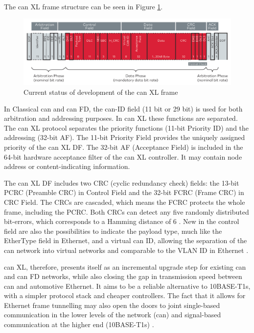 The \gls{can} XL frame structure can be seen in Figure \ref{fig:CANXL_Frame}.

\begin{figure}
    \centering
    \includegraphics[width = \textwidth]{img/parts/introduction/CAN XL.png}
    \caption{Current status of development of the \gls{can} XL frame \citep{VectorCANXL}}
    \label{fig:CANXL_Frame}
\end{figure}

In Classical \gls{can} and \gls{can} FD, the \gls{can}-ID field (11 bit or 29 bit) is used for both arbitration and addressing purposes. In \gls{can} XL these functions are separated. The \gls{can} XL protocol separates the priority functions (11-bit Priority ID) and the addressing (32-bit AF). The 11-bit Priority Field provides the uniquely assigned priority of the \gls{can} XL DF. The 32-bit AF (Acceptance Field) is included in the 64-bit hardware acceptance filter of the \gls{can} XL controller. It may contain node address or content-indicating information.\par

The \gls{can} XL DF includes two CRC (cyclic redundancy check) fields: the 13-bit PCRC (Preamble CRC) in Control Field and the 32-bit FCRC (Frame CRC) in CRC Field. The CRCs are cascaded, which means the FCRC protects the whole frame, including the PCRC. Both CRCs can detect any five randomly distributed bit-errors, which corresponds to a Hamming distance of 6 \citep{CiACANXL}. New in the control field are also the possibilities to indicate the payload type, much like the EtherType field in Ethernet, and a virtual \gls{can} ID, allowing the separation of the \gls{can} network into virtual networks and comparable to the VLAN ID in Ethernet \citep{BoschCANXL}.\par

\gls{can} XL, therefore, presents itself as an incremental upgrade step for existing \gls{can} and \gls{can} FD networks, while also closing the gap in transmission speed between \gls{can} and automotive Ethernet. It aims to be a reliable alternative to 10BASE-T1s, with a simpler protocol stack and cheaper controllers. The fact that it allows for Ethernet frame tunnelling may also open the doors to joint single-based communication in the lower levels of the network (\gls{can}) and signal-based communication at the higher end (10BASE-T1s) \citep{VectorCANXL}.

